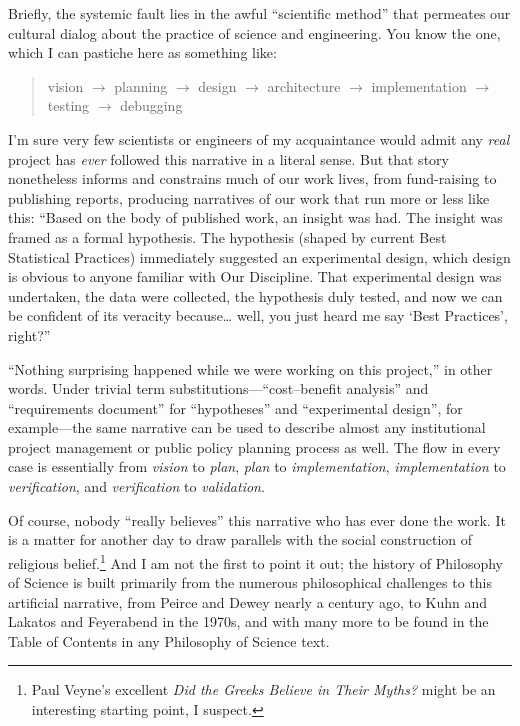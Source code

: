 Briefly, the systemic fault lies in the awful ``scientific method'' that permeates our cultural dialog about the practice of science and engineering. You know the one, which I can pastiche here as something like:

\begin{quote}
vision $\rightarrow$ planning $\rightarrow$ design $\rightarrow$ architecture $\rightarrow$ implementation $\rightarrow$ testing $\rightarrow$ debugging
\end{quote}

I'm sure very few scientists or engineers of my acquaintance would admit any \emph{real} project has \emph{ever} followed this narrative in a literal sense. But that story nonetheless informs and constrains much of our work lives, from fund-raising to publishing reports, producing narratives of our work that run more or less like this: ``Based on the body of published work, an insight was had. The insight was framed as a formal hypothesis. The hypothesis (shaped by current Best Statistical Practices) immediately suggested an experimental design, which design is obvious to anyone familiar with Our Discipline. That experimental design was undertaken, the data were collected, the hypothesis duly tested, and now we can be confident of its veracity because\ldots{} well, you just heard me say `Best  Practices', right?''

``Nothing surprising happened while we were working on this project,'' in other words. Under trivial term substitutions---``cost--benefit analysis'' and ``requirements document'' for ``hypotheses'' and ``experimental design'', for example---the same narrative can be used to describe almost any institutional project management or public policy planning process as well. The flow in every case is essentially from \emph{vision} to \emph{plan}, \emph{plan} to \emph{implementation}, \emph{implementation} to \emph{verification}, and \emph{verification} to \emph{validation}.

Of course, nobody ``really believes'' this narrative who has ever done the work. It is a matter for another day to draw parallels with the social construction of religious belief.\footnote{Paul Veyne's excellent \emph{Did the Greeks Believe in Their Myths?} \citep{Veyne:1988} might be an interesting starting point, I suspect.} And I am not the first to point it out; the history of Philosophy of Science is built primarily from the numerous philosophical challenges to this artificial narrative, from Peirce and Dewey nearly a century ago, to Kuhn and Lakatos and Feyerabend in the 1970s, and with many more to be found in the Table of Contents in any Philosophy of Science text.

